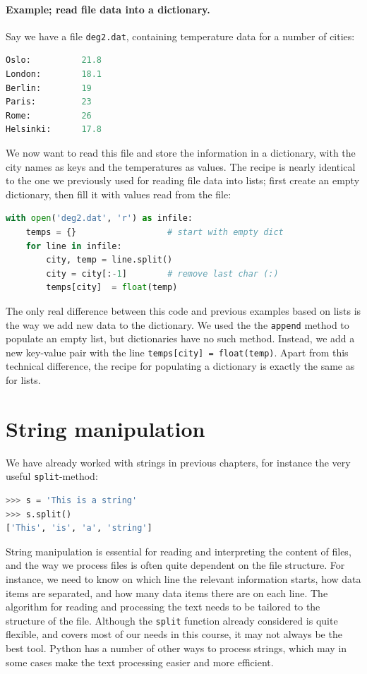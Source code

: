 \documentclass[graybox,envcountchap,sectrefs,final]{svmonodo}
\begin{document}
\paragraph{Example; read file data into a dictionary.}
Say we have a file \texttt{deg2.dat}, containing temperature data for a number of cities:
\begin{lstlisting}[language=Python,style=gray]
Oslo:          21.8
London:        18.1
Berlin:        19
Paris:         23
Rome:          26
Helsinki:      17.8
\end{lstlisting}
We now want to read this file and store the information in a dictionary, with the
city names as keys and the temperatures as values. The recipe is nearly identical to
the one we previously used for reading file data into lists; first create an empty dictionary, then
fill it with values read from the file:
\begin{lstlisting}[language=Python,style=blue1bar]
with open('deg2.dat', 'r') as infile:
    temps = {}                  # start with empty dict
    for line in infile:
        city, temp = line.split()
        city = city[:-1]        # remove last char (:)
        temps[city]  = float(temp)
\end{lstlisting}
The only real difference between this code and previous examples based on lists
is the way we add new data to the dictionary. We used the the
\texttt{append} method to populate an empty list, but dictionaries have no such method. Instead,
we add a new key-value pair with the line \texttt{temps[city] = float(temp)}. Apart from this technical
difference, the recipe for populating a dictionary is exactly the same as for lists.


\section{String manipulation}
We have already worked with strings in previous chapters, for instance the very
useful \texttt{split}-method:
\begin{lstlisting}[language=Python,style=blue1]
>>> s = 'This is a string'
>>> s.split()
['This', 'is', 'a', 'string']
\end{lstlisting}
String manipulation is essential for reading and interpreting the content of files,
and the way we process files is often quite dependent on the file structure. For
instance, we need to know on which line the relevant information starts, how data items
are separated, and how many data items there are on each line. The algorithm for reading and processing
the text needs to be tailored to the structure of the file. Although the \texttt{split} function already considered is quite
flexible, and covers most of our needs in this course, it may not
always be the best tool. Python has a number of other ways to process strings,
which may in some cases make the text processing easier and more efficient.
\end{document}

